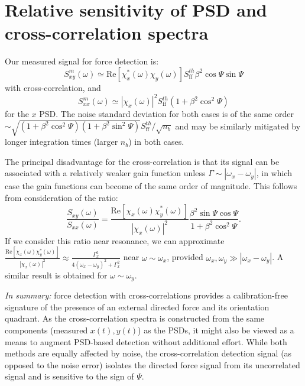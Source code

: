 \documentclass[twocolumn,english,notitlepage,superscriptaddress,nofootinbib]{revtex4-2}
\begin{document}
\section{Relative sensitivity of PSD and cross-correlation spectra}

Our measured signal for force detection is:
\begin{equation}
  S^{m}_{xy} (\omega) \simeq  \text{Re}[\chi^*_x(\omega)\chi_y(\omega)]S^{th}_{\text{ff}}\beta^2 \cos \Psi \sin \Psi
\end{equation}
with cross-correlation, and
\begin{equation}
  S^{m}_{xx}(\omega) \simeq   |\chi_x(\omega)|^2 S^{th}_{\text{ff}}(1+\beta^2 \cos^2 \Psi)
\end{equation}
for the $x$ PSD.  The noise standard deviation for both cases is of the same order $\sim \sqrt{(1+\beta^2\cos^2 \Psi)  (1+\beta^2\sin^2 \Psi)} S^{th}_{\text{ff}}/\sqrt{n_b}$  and may be similarly mitigated by longer integration times (larger $n_b$) in both cases.

The  principal disadvantage  for the cross-correlation is that its signal can be associated with a relatively weaker gain function unless   $\Gamma \sim |\omega_x-\omega_y|$,  in which case the gain functions can become of the same order of magnitude.  This follows from  consideration of the ratio:
\begin{equation}
\label{RelGain}
\frac{S_{xy}(\omega)}{S_{xx}(\omega)} = \frac{\text{Re}[\chi_x(\omega)\chi_y^*(\omega)]}{|\chi_x(\omega)|^2} \frac{\beta^2 \sin \Psi \cos \Psi}{1+\beta^2 \cos^2 \Psi }. 
\end{equation}
If we consider this ratio near resonance,   we can approximate $\frac{\text{Re}[\chi_x(\omega)\chi_y^*(\omega)]}{|\chi_x(\omega)|^2} \approx \frac{\Gamma_x^2}{4(\omega_x-\omega_y)^2 +\Gamma_x^2} $  near $\omega \sim \omega_x$,  provided  $\omega_x,\omega_y \gg |\omega_x-\omega_y| $.   
A similar result is obtained for $\omega \sim \omega_y$.

{\em In summary:}  force detection with cross-correlations provides a calibration-free signature of the presence of an external directed force and its orientation quadrant.  As the cross-correlation spectra is constructed from the same components (measured $x(t),y(t)$) as the PSDs, it might also be viewed as a means to augment PSD-based detection without additional effort.  While both methods are equally affected by noise, the cross-correlation detection signal (as opposed to the noise error)  isolates the directed force signal from its uncorrelated signal and is sensitive to the sign of $\Psi$.
\end{document}

